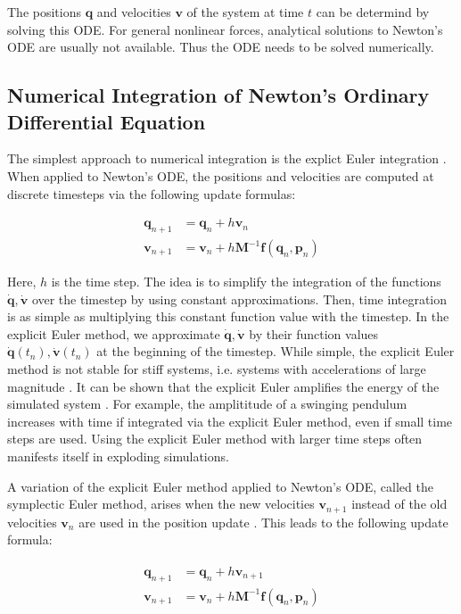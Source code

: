 The positions $\bm{q}$ and velocities $\bm{v}$ of the system at time $t$ can be determind by solving this ODE. For general nonlinear forces,
analytical solutions to Newton's ODE are usually not available. Thus the ODE needs to be solved numerically.

\subsection{Numerical Integration of Newton's Ordinary Differential Equation}\label{s:numerical-integration}
The simplest approach to numerical integration is the explict Euler integration \cite{chapra2005}. When applied to Newton's ODE, 
the positions and velocities are computed at discrete timesteps via the following update formulas:

\begin{align*}
    \bm{q}_{n+1} &= \bm{q}_n + h\bm{v}_n\\
    \bm{v}_{n+1} &= \bm{v}_n + h\bm{M}^{-1}\bm{f}(\bm{q}_n, \bm{p}_n)
\end{align*}

\noindent Here, $h$ is the time step. The idea is to simplify the integration of the functions $\bm{\dot{q}}, \bm{\dot{v}}$ over the timestep by 
using constant approximations. 
Then, time integration is as simple as multiplying this constant function value with the timestep. In the explicit Euler method, we 
approximate $\bm{\dot{q}}, \bm{\dot{v}}$ by their function values $\bm{\dot{q}}(t_n), \bm{\dot{v}}(t_n)$ at the beginning of the timestep.
While simple, the explicit Euler method is not stable for stiff systems, i.e. systems with accelerations of large magnitude 
\cite{chapra2005}. It can be shown that the explicit Euler amplifies the energy of the simulated system \cite{stern2006}. For example, the 
amplititude of a swinging pendulum increases with time if integrated via the explicit Euler method, even if small time steps are used. 
Using the explicit Euler method with larger time steps often manifests itself in exploding simulations. 

A variation of the explicit Euler method applied to Newton's ODE, called the symplectic Euler method, arises when the new velocities 
$\bm{v}_{n+1}$ instead of the old velocities $\bm{v}_n$ are used in the position update \cite{stern2006}. This leads to the following 
update formula:

\begin{align}
    \begin{split}\label{eq:symplectic-euler}
        \bm{q}_{n+1} &= \bm{q}_n + h\bm{v}_{n+1}\\
        \bm{v}_{n+1} &= \bm{v}_n + h\bm{M}^{-1}\bm{f}(\bm{q}_n, \bm{p}_n)
    \end{split}
\end{align}

